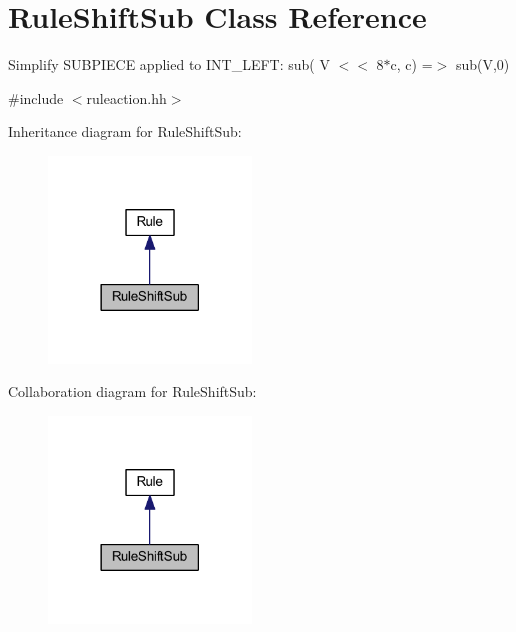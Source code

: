 \hypertarget{class_rule_shift_sub}{}\section{Rule\+Shift\+Sub Class Reference}
\label{class_rule_shift_sub}


Simplify S\+U\+B\+P\+I\+E\+CE applied to I\+N\+T\+\_\+\+L\+E\+FT\+: {\ttfamily sub( V $<$$<$ 8$\ast$c, c) =$>$ sub(\+V,0)}  




{\ttfamily \#include $<$ruleaction.\+hh$>$}



Inheritance diagram for Rule\+Shift\+Sub\+:
\nopagebreak
\begin{figure}[H]
\begin{center}
\leavevmode
\includegraphics[width=153pt]{class_rule_shift_sub__inherit__graph}
\end{center}
\end{figure}


Collaboration diagram for Rule\+Shift\+Sub\+:
\nopagebreak
\begin{figure}[H]
\begin{center}
\leavevmode
\includegraphics[width=153pt]{class_rule_shift_sub__coll__graph}
\end{center}
\end{figure}
